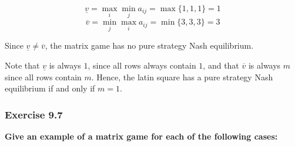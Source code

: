 \documentclass[12pt, a4paper]{article}
\begin{document}
\[ \underline{v} = \max_i \min_j a_{ij} = \max\{1, 1, 1\} = 1 \]
\[ \overline{v} = \min_j \max_i a_{ij} = \min\{3, 3, 3\} = 3 \]

Since $\underline{v} \neq \overline{v}$, the matrix game has no pure strategy Nash equilibrium.

Note that $\underline{v}$ is always $1$, since all rows always contain $1$, and that $\overline{v}$ is always $m$ since all rows contain $m$. Hence, the latin square has a pure strategy Nash equilibrium if and only if $m=1$.


\subsubsection*{Exercise 9.7}

\textbf{Give an example of a matrix game for each of the following cases:}
\end{document}
